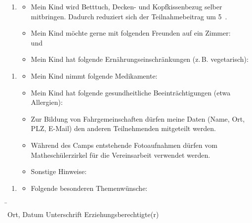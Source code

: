 \documentclass[13pt]{zettel}
\newenvironment{themabox}[1]{%
  \vspace{-0.8em}%
  \begin{enumerate}[labelindent=0pt,labelwidth=2.35cm,itemindent=0em,leftmargin=!,align=left]
    \item[\textbf{#1}]
      \begin{itemize}
}{\end{itemize}\end{enumerate}\vspace{-0.3em}}
\begin{document}
\begin{shaded}\begin{themabox}{Unterkunft}
\item Mein Kind wird Betttuch, Decken- und Kopfkissenbezug selber mitbringen.
Dadurch reduziert sich der Teilnahmebeitrag um 5~\texteuro{}.
\item Mein Kind möchte gerne mit folgenden Freunden auf ein Zimmer: \\[1em] \freistMittel \quad und \quad \freistMittel
\item Mein Kind hat folgende Ernährungseinschränkungen (z.\,B. vegetarisch): \\[1em]
\freist{13cm}
\end{themabox}\end{shaded}
\vspace{-0.5cm}

\begin{shaded}\begin{themabox}{Sonstiges}
\item Mein Kind nimmt folgende Medikamente:
\freist{5.4cm}
\item Mein Kind hat folgende gesundheitliche Beeinträchtigungen
(etwa Allergien): \\[1em] \freist{13cm}
\item Zur Bildung von Fahrgemeinschaften dürfen meine Daten (Name, Ort, PLZ,
E-Mail) den anderen Teilnehmenden mitgeteilt werden.
\item Während des Camps entstehende Fotoaufnahmen dürfen
vom Mathe\-schü\-ler\-zir\-kel für die Vereinsarbeit verwendet werden.
\item Sonstige Hinweise: \freist{10cm}
\end{themabox}
\end{shaded}
\vspace{-0.5cm}

\begin{shaded}\begin{themabox}{Mathe}
\item[] Folgende besonderen Themenwünsche:
\freist{6.85cm}
\end{themabox}
\end{shaded}

\begin{tabbing}
\freistMittel \qquad\qquad \= \kill
\freistMittel \> \freistLaenger \\
Ort, Datum \> Unterschrift Erziehungsberechtigte(r)
\end{tabbing}
\end{document}
